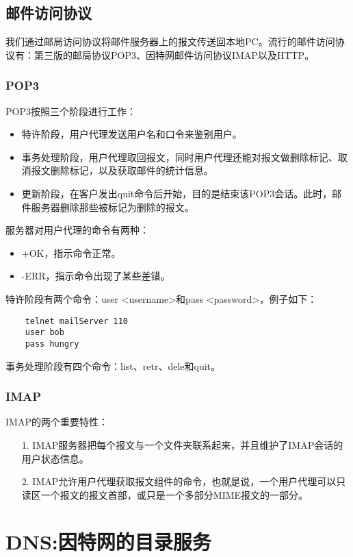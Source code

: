 \documentclass[a4paper,left=2.5cm,right=2.5cm,11pt]{article}
\begin{document}
\subsection{邮件访问协议}
	我们通过邮局访问协议将邮件服务器上的报文传送回本地PC。流行的邮件访问协议有：第三版的邮局协议POP3、因特网邮件访问协议IMAP以及HTTP。

\subsubsection{POP3}
	POP3按照三个阶段进行工作：
	\begin{itemize}
		\item 特许阶段，用户代理发送用户名和口令来鉴别用户。
		\item 事务处理阶段，用户代理取回报文，同时用户代理还能对报文做删除标记、取消报文删除标记，以及获取邮件的统计信息。
		\item 更新阶段，在客户发出quit命令后开始，目的是结束该POP3会话。此时，邮件服务器删除那些被标记为删除的报文。
	\end{itemize}

	服务器对用户代理的命令有两种：
	\begin{itemize}
		\item +OK，指示命令正常。
		\item -ERR，指示命令出现了某些差错。
	\end{itemize}

	特许阶段有两个命令：user <username>和pass <password>，例子如下：
	\begin{lstlisting}
	telnet mailServer 110
	user bob
	pass hungry
	\end{lstlisting}

	事务处理阶段有四个命令：list、retr、dele和quit。

\subsubsection{IMAP}
	IMAP的两个重要特性：
	\begin{itemize}
		\item[1.] IMAP服务器把每个报文与一个文件夹联系起来，并且维护了IMAP会话的用户状态信息。
		\item[2.] IMAP允许用户代理获取报文组件的命令，也就是说，一个用户代理可以只读区一个报文的报文首部，或只是一个多部分MIME报文的一部分。
	\end{itemize}

\section{DNS:因特网的目录服务}
\end{document}
